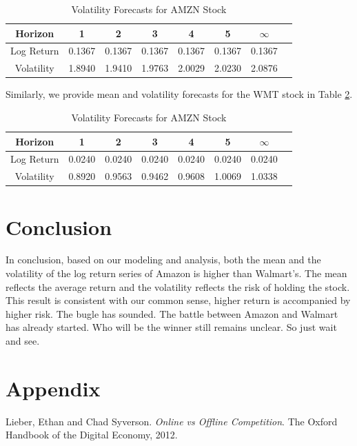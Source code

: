 \documentclass[paper=a4, fontsize=11pt]{article}
\begin{document}
\begin{table}
\caption{Volatility Forecasts for AMZN Stock}
  \centering
\begin{tabular}[!htbp]{c|ccccccc}
\hline Horizon & 1 & 2 & 3 & 4 & 5 & $\infty$ \\ 
\hline Log Return & 0.1367 & 0.1367 & 0.1367 & 0.1367 & 0.1367 & 0.1367 \\
Volatility & 1.8940 & 1.9410 & 1.9763 &  2.0029 & 2.0230 & 2.0876\\
\hline
\end{tabular}
\label{fc_amzn}
\end{table}

Similarly, we provide mean and volatility forecasts for the WMT stock in Table \ref{fc_wmt}.
\begin{table}
\caption{Volatility Forecasts for AMZN Stock}
  \centering
\begin{tabular}[!htbp]{c|ccccccc}
\hline Horizon & 1 & 2 & 3 & 4 & 5 & $\infty$ \\ 
\hline Log Return & 0.0240 & 0.0240 & 0.0240 & 0.0240 & 0.0240 & 0.0240 \\
Volatility & 0.8920 & 0.9563 & 0.9462 & 0.9608 & 1.0069 & 1.0338\\
\hline
\end{tabular}
\label{fc_wmt}
\end{table}


\section{Conclusion}
In conclusion, based on our modeling and analysis, both the mean and the volatility of the log return series of Amazon is higher than Walmart’s. The mean reflects the average return and the volatility reflects the risk of holding the stock. This result is consistent with our common sense, higher return is accompanied by higher risk.  
The bugle has sounded. The battle between Amazon and Walmart has already started. Who will be the winner still remains unclear. So just wait and see.

\section{Appendix}

\begin{thebibliography}{99}
Lieber, Ethan and Chad Syverson. 
\textit{Online vs Offline Competition}. 
The Oxford Handbook of the Digital Economy, 2012.
\end{thebibliography}
\end{document}
